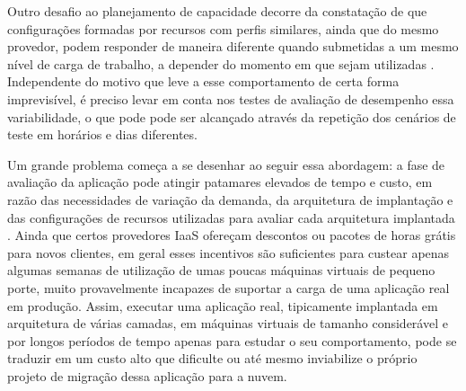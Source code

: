 \documentclass[12pt]{article}
\begin{document}
Outro desafio ao planejamento de capacidade decorre da constatação de que configurações formadas por recursos com perfis similares, ainda que do mesmo provedor, podem responder de maneira diferente quando submetidas a um mesmo nível de carga de trabalho, a depender do momento em que sejam utilizadas \cite{cunha2011investigating, iosup2011performance, jayasinghe2011variations}. Independente do motivo que leve a esse comportamento de certa forma imprevisível, é preciso levar em conta nos testes de avaliação de desempenho essa variabilidade, o que pode pode ser alcançado através da repetição dos cenários de teste em horários e dias diferentes.

Um grande problema começa a se desenhar ao seguir essa abordagem: a fase de avaliação da aplicação pode atingir patamares elevados de tempo e custo, em razão das necessidades de variação da demanda, da arquitetura de implantação e das configurações de recursos utilizadas para avaliar cada arquitetura implantada \cite{silva2013cloudbench}. 
Ainda que certos provedores IaaS ofereçam descontos ou pacotes de horas grátis para novos clientes, em geral esses incentivos são suficientes para custear apenas algumas semanas de utilização de umas poucas máquinas virtuais de pequeno porte, muito provavelmente incapazes de suportar a carga de uma aplicação real em produção. Assim, executar 
uma aplicação real, tipicamente implantada em arquitetura de várias camadas, em máquinas virtuais de tamanho considerável e por longos períodos de tempo apenas para estudar o seu comportamento, pode se traduzir em um custo alto que dificulte ou até mesmo inviabilize o próprio projeto de migração dessa aplicação para a nuvem. 
\end{document}
